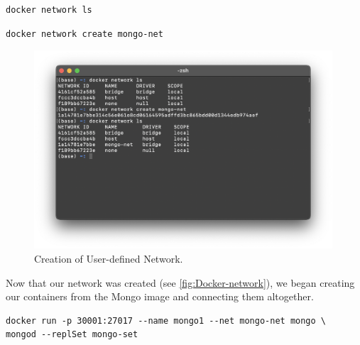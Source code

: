 \documentclass{article}
\begin{document}
\begin{tcolorbox}[colback=CrispBlue!5!white,colframe=CrispBlue!75!black,title=List all networks created in Docker]
\begin{verbatim}    
docker network ls
\end{verbatim}
\end{tcolorbox}

\begin{tcolorbox}[colback=CrispBlue!5!white,colframe=CrispBlue!75!black,title=Create our user-defined network]
\begin{verbatim}
docker network create mongo-net
\end{verbatim}
\end{tcolorbox}

\begin{figure}[ht]
    \centering
    \includegraphics[width=0.99\textwidth]{Docker-network.png}
    \vspace{-3em}\caption{Creation of User-defined Network.}
    \label{fig:Docker-network}
\end{figure}

\newpage
Now that our network was created (see \autoref{fig:Docker-network}), we began creating our containers from the Mongo image and connecting them altogether.

\begin{tcolorbox}[colback=CrispBlue!5!white,colframe=CrispBlue!75!black,title=Create first MongoDB image]    
\begin{verbatim}
docker run -p 30001:27017 --name mongo1 --net mongo-net mongo \
mongod --replSet mongo-set
\end{verbatim}
\end{tcolorbox}
\end{document}
